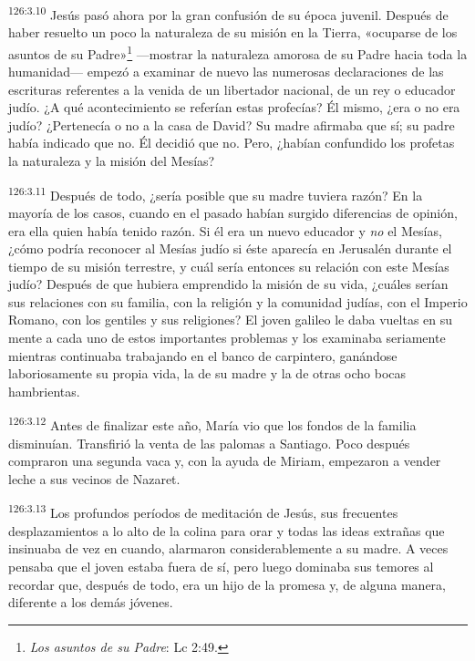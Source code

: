 \par
\textsuperscript{126:3.10} Jesús pasó ahora por la gran confusión de su época juvenil. Después de haber resuelto un poco la naturaleza de su misión en la Tierra, «ocuparse de los asuntos de su Padre»\footnote{\textit{Los asuntos de su Padre}: Lc 2:49.} ---mostrar la naturaleza amorosa de su Padre hacia toda la humanidad--- empezó a examinar de nuevo las numerosas declaraciones de las escrituras referentes a la venida de un libertador nacional, de un rey o educador judío. ¿A qué acontecimiento se referían estas profecías? Él mismo, ¿era o no era judío? ¿Pertenecía o no a la casa de David? Su madre afirmaba que sí; su padre había indicado que no. Él decidió que no. Pero, ¿habían confundido los profetas la naturaleza y la misión del Mesías?

\par
\textsuperscript{126:3.11} Después de todo, ¿sería posible que su madre tuviera razón? En la mayoría de los casos, cuando en el pasado habían surgido diferencias de opinión, era ella quien había tenido razón. Si él era un nuevo educador y \textit{no} el Mesías, ¿cómo podría reconocer al Mesías judío si éste aparecía en Jerusalén durante el tiempo de su misión terrestre, y cuál sería entonces su relación con este Mesías judío? Después de que hubiera emprendido la misión de su vida, ¿cuáles serían sus relaciones con su familia, con la religión y la comunidad judías, con el Imperio Romano, con los gentiles y sus religiones? El joven galileo le daba vueltas en su mente a cada uno de estos importantes problemas y los examinaba seriamente mientras continuaba trabajando en el banco de carpintero, ganándose laboriosamente su propia vida, la de su madre y la de otras ocho bocas hambrientas.

\par
\textsuperscript{126:3.12} Antes de finalizar este año, María vio que los fondos de la familia disminuían. Transfirió la venta de las palomas a Santiago. Poco después compraron una segunda vaca y, con la ayuda de Miriam, empezaron a vender leche a sus vecinos de Nazaret.

\par
\textsuperscript{126:3.13} Los profundos períodos de meditación de Jesús, sus frecuentes desplazamientos a lo alto de la colina para orar y todas las ideas extrañas que insinuaba de vez en cuando, alarmaron considerablemente a su madre. A veces pensaba que el joven estaba fuera de sí, pero luego dominaba sus temores al recordar que, después de todo, era un hijo de la promesa y, de alguna manera, diferente a los demás jóvenes.

